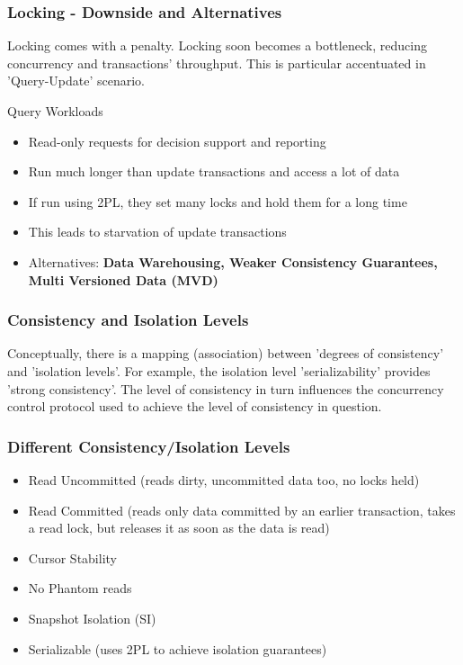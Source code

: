 \documentclass[12]{beamer}
\begin{document}
\begin{frame}
  \frametitle{Locking - Downside and Alternatives}
Locking comes with a penalty. Locking soon becomes a bottleneck, reducing concurrency and transactions' throughput. This is particular accentuated in 'Query-Update' scenario.
  \begin{block}{Query Workloads}
    \begin{itemize}
      \item Read-only requests for decision support and reporting
      \item Run much longer than update transactions and access a lot of data
      \item If run using 2PL, they set many locks and hold them for a long time
      \item This leads to starvation of update transactions
      \item Alternatives: \textbf{Data Warehousing, Weaker Consistency Guarantees, Multi Versioned Data (MVD)}
    \end{itemize}
  \end{block}
\end{frame}

\begin{frame}
\frametitle{Consistency and Isolation Levels}
Conceptually, there is a mapping (association) between 'degrees of consistency' and 'isolation levels'. For example, the isolation level 'serializability' provides 'strong consistency'. The level of consistency in turn influences the concurrency control protocol used to achieve the level of consistency in question.
\end{frame}

\begin{frame}
\frametitle{Different Consistency/Isolation Levels}
\begin{itemize}
\item Read Uncommitted (reads dirty, uncommitted data too, no locks held)
\item Read Committed (reads only data committed by an earlier transaction, takes a read lock, but releases it as soon as the data is read)
\item Cursor Stability
\item No Phantom reads
\item Snapshot Isolation (SI)
\item Serializable (uses 2PL to achieve isolation guarantees)
\end{itemize}
\end{frame}
\end{document}
